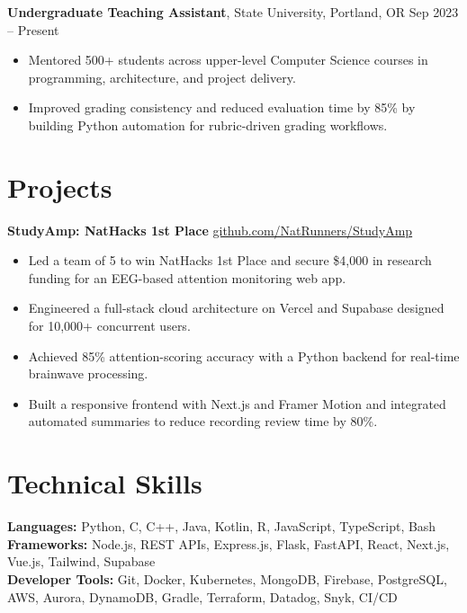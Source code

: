 \documentclass[10pt, letterpaper]{article}
\begin{document}
\textbf{Undergraduate Teaching Assistant}, State University, Portland, OR \hfill Sep 2023 -- Present
\begin{itemize}
    \item Mentored 500+ students across upper-level Computer Science courses in programming, architecture, and project delivery.
    \item Improved grading consistency and reduced evaluation time by 85\% by building Python automation for rubric-driven grading workflows.
\end{itemize}

\section{Projects}
\textbf{StudyAmp: NatHacks 1st Place} \hfill \href{https://github.com/NatRunners/StudyAmp}{github.com/NatRunners/StudyAmp}
\begin{itemize}
    \item Led a team of 5 to win NatHacks 1st Place and secure \$4,000 in research funding for an EEG-based attention monitoring web app.
    \item Engineered a full-stack cloud architecture on Vercel and Supabase designed for 10,000+ concurrent users.
    \item Achieved 85\% attention-scoring accuracy with a Python backend for real-time brainwave processing.
    \item Built a responsive frontend with Next.js and Framer Motion and integrated automated summaries to reduce recording review time by 80\%.
\end{itemize}

\section{Technical Skills}
\textbf{Languages:} Python, C, C++, Java, Kotlin, R, JavaScript, TypeScript, Bash\\
\textbf{Frameworks:} Node.js, REST APIs, Express.js, Flask, FastAPI, React, Next.js, Vue.js, Tailwind, Supabase\\
\textbf{Developer Tools:} Git, Docker, Kubernetes, MongoDB, Firebase, PostgreSQL, AWS, Aurora, DynamoDB, Gradle, Terraform, Datadog, Snyk, CI/CD
\end{document}

